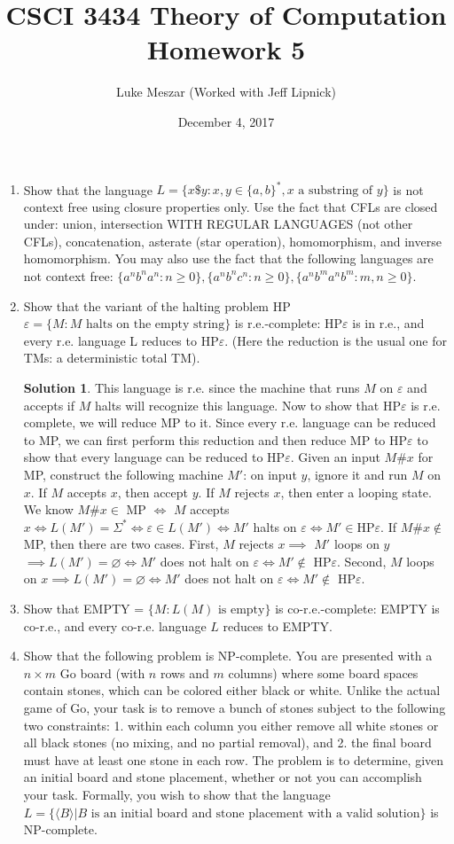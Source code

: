 \documentclass{article}
\title{CSCI 3434 Theory of Computation Homework 5}
\author{Luke Meszar (Worked with Jeff Lipnick)}
\date{December 4, 2017}
\newcommand{\es}{\varnothing}
\renewcommand{\epsilon}{\varepsilon}
\theoremstyle{definition}
\newtheorem*{solution*}{Solution}
\begin{document}
\maketitle
\begin{enumerate}
	\item Show that the language $L = \{x\$y : x,y \in \{a,b\}^*, x \text{ a substring of } y\}$ is not context free using closure properties only.  Use the fact that CFLs are closed under: union, intersection WITH REGULAR LANGUAGES (not other CFLs), concatenation, asterate (star operation), homomorphism, and inverse homomorphism.  You may also use the fact that the following languages are not context free: $\{a^n b^n a^n : n \geq 0\}, \{a^n b^n c^n : n \geq 0\}, \{a^n b^m a^n b^m : m,n \geq 0\}$.
	\item Show that the variant of the halting problem HP$\epsilon = \{M : M \text{ halts on the empty string}\}$ is r.e.-complete: HP$\epsilon$ is in r.e., and every r.e. language L reduces to HP$\epsilon$. (Here the reduction is the usual one for TMs: a deterministic total TM).
	\begin{solution*}
		This language is r.e. since the machine that runs $M$ on $\epsilon$ and accepts if $M$ halts will recognize this language. Now to show that HP$\epsilon$ is r.e. complete, we will reduce MP to it. Since every r.e. language can be reduced to MP, we can first perform this reduction and then reduce MP to HP$\epsilon$ to show that every language can be reduced to HP$\epsilon$. Given an input $M\#x$ for MP, construct the following machine $M'$: on input $y$, ignore it and run $M$ on $x$. If $M$ accepts $x$, then accept $y$. If $M$ rejects $x$, then enter a looping state. We know $M\#x \in $ MP $\iff$ $M$ accepts $x \iff L(M') = \Sigma^* \iff\epsilon \in L(M') \iff M'$ halts on $\epsilon \iff M' \in $HP$\epsilon$. If $M\#x \not\in$ MP, then there are two cases. First, $M$ rejects $x \implies$ $M'$ loops on $y$ $\implies L(M') = \es \iff M'$ does not halt on $\epsilon \iff M' \not\in $ HP$\epsilon$. Second, $M$ loops on $x \implies L(M') = \es \iff M'$ does not halt on $\epsilon \iff M' \not\in $ HP$\epsilon$.
	\end{solution*}
	\item Show that EMPTY = $\{M : L(M) \text{ is empty}\}$ is co-r.e.-complete: EMPTY is co-r.e., and every co-r.e. language $L$ reduces to EMPTY.
\item Show that the following problem is NP-complete.  You are presented with a $n \times m$ Go board (with $n$ rows and $m$ columns) where some board spaces contain stones, which can be colored either black or white.  Unlike the actual game of Go, your task is to remove a bunch of stones subject to the following two constraints: 1. within each column you either remove all white stones or all black stones (no mixing, and no partial removal), and 2. the final board must have at least one stone in each row.  The problem is to determine, given an initial board and stone placement, whether or not you can accomplish your task.  Formally, you wish to show that the language $L = \{\langle B \rangle | B \text{ is an initial board and stone placement with a valid solution}\}$ is NP-complete.

\end{enumerate}
\end{document}
